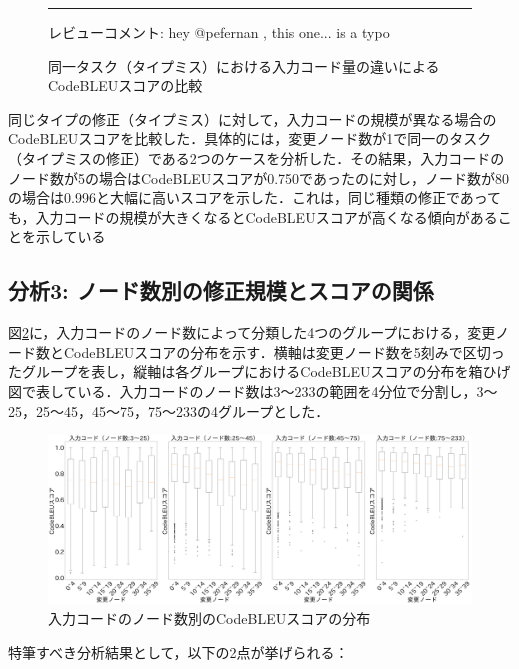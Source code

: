 \documentclass[11pt]{jreport}
\begin{document}
\begin{figure}[h]
{\begin{minipage}{0.95\linewidth}
        \normalfont\hrule
        レビューコメント: hey @pefernan , this one... is a typo
    \end{minipage}}
    \caption{同一タスク（タイプミス）における入力コード量の違いによるCodeBLEUスコアの比較}
    \label{fig:code-comparison}
\end{figure}

同じタイプの修正（タイプミス）に対して，入力コードの規模が異なる場合のCodeBLEUスコアを比較した．具体的には，変更ノード数が1で同一のタスク（タイプミスの修正）である2つのケースを分析した．その結果，入力コードのノード数が5の場合はCodeBLEUスコアが0.750であったのに対し，ノード数が80の場合は0.996と大幅に高いスコアを示した．これは，同じ種類の修正であっても，入力コードの規模が大きくなるとCodeBLEUスコアが高くなる傾向があることを示している

\subsection {分析3: ノード数別の修正規模とスコアの関係}
図\ref{fig:node-scores}に，入力コードのノード数によって分類した4つのグループにおける，変更ノード数とCodeBLEUスコアの分布を示す．横軸は変更ノード数を5刻みで区切ったグループを表し，縦軸は各グループにおけるCodeBLEUスコアの分布を箱ひげ図で表している．入力コードのノード数は3〜233の範囲を4分位で分割し，3〜25，25〜45，45〜75，75〜233の4グループとした．

\begin{figure}[h]
   \centering
   \includegraphics[width=1.0\linewidth]{@BSthesis2024_Akamatsu/Akamatsu_figs/nodescores.pdf}
   \caption{入力コードのノード数別のCodeBLEUスコアの分布}
   \label{fig:node-scores}
\end{figure}

特筆すべき分析結果として，以下の2点が挙げられる：
\end{document}

